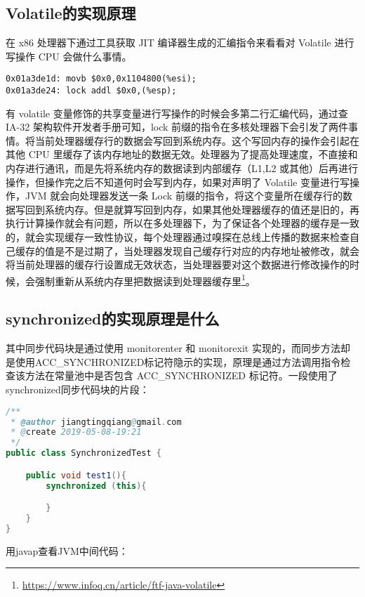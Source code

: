 \documentclass[../../../interview-questions.tex]{subfiles}
\begin{document}
\subsection{Volatile的实现原理}

在 x86 处理器下通过工具获取 JIT 编译器生成的汇编指令来看看对 Volatile 进行写操作 CPU 会做什么事情。

\begin{lstlisting}
0x01a3de1d: movb $0x0,0x1104800(%esi);
0x01a3de24: lock addl $0x0,(%esp);
\end{lstlisting}

有 volatile 变量修饰的共享变量进行写操作的时候会多第二行汇编代码，通过查 IA-32 架构软件开发者手册可知，lock 前缀的指令在多核处理器下会引发了两件事情。将当前处理器缓存行的数据会写回到系统内存。这个写回内存的操作会引起在其他 CPU 里缓存了该内存地址的数据无效。处理器为了提高处理速度，不直接和内存进行通讯，而是先将系统内存的数据读到内部缓存（L1,L2 或其他）后再进行操作，但操作完之后不知道何时会写到内存，如果对声明了 Volatile 变量进行写操作，JVM 就会向处理器发送一条 Lock 前缀的指令，将这个变量所在缓存行的数据写回到系统内存。但是就算写回到内存，如果其他处理器缓存的值还是旧的，再执行计算操作就会有问题，所以在多处理器下，为了保证各个处理器的缓存是一致的，就会实现缓存一致性协议，每个处理器通过嗅探在总线上传播的数据来检查自己缓存的值是不是过期了，当处理器发现自己缓存行对应的内存地址被修改，就会将当前处理器的缓存行设置成无效状态，当处理器要对这个数据进行修改操作的时候，会强制重新从系统内存里把数据读到处理器缓存里\footnote{\url{https://www.infoq.cn/article/ftf-java-volatile}}。

\subsection{synchronized的实现原理是什么}

其中同步代码块是通过使用 monitorenter 和 monitorexit 实现的，而同步方法却是使用ACC\_SYNCHRONIZED标记符隐示的实现，原理是通过方法调用指令检查该方法在常量池中是否包含 ACC\_SYNCHRONIZED 标记符。一段使用了synchronized同步代码块的片段：

\begin{lstlisting}[language=Java]
/**
 * @author jiangtingqiang@gmail.com
 * @create 2019-05-08-19:21
 */
public class SynchronizedTest {

    public void test1(){
        synchronized (this){

        }
    }
}
\end{lstlisting}

用javap查看JVM中间代码：
\end{document}
